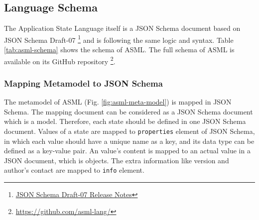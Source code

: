 \subsection{Language Schema}
The Application State Language itself is a JSON Schema document based on JSON Schema Draft-07
\footnote{\href{https://json-schema.org/draft-07/json-schema-release-notes.html}{JSON Schema Draft-07 Release Notes}}
and is following the same logic and syntax. Table \ref{tab:asml-schema} shows the schema of ASML. 
The full schema of ASML is available on its GitHub repository
\footnote{\href{https://github.com/asml-lang/asml/blob/master/schemas/schema.json}{https://github.com/asml-lang/}}.

\subsubsection{Mapping Metamodel to JSON Schema}
The metamodel of ASML (Fig. \ref{fig:asml-meta-model}) is mapped in JSON Schema. The mapping document can be considered as a JSON Schema document which is a model. Therefore, each state should be defined in one JSON Schema document. Values of a state are mapped to \lstinline[basicstyle=\ttfamily]{properties} element of JSON Schema, in which each value should have a unique name as a key, and its data type can be defined as a key-value pair. An value’s content is mapped to an actual value in a JSON document, which is objects. The extra information like version and author’s contact are mapped to \lstinline[basicstyle=\ttfamily]{info} element.

